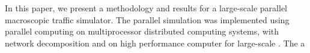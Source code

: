 In this paper, we present a methodology and results for a large-scale parallel macroscopic traffic simulator. The parallel simulation was implemented using parallel computing on multiprocessor distributed computing systems, with network decomposition and  on high performance computer for large-scale . The a